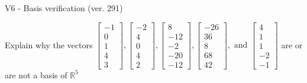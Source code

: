 \begin{exercise}
  \begin{exerciseTitle}V6 - Basis verification (ver. 291)\end{exerciseTitle}
  \begin{exerciseStatement}
    Explain why the vectors \(\left[\begin{array}{r}
-1 \\
0 \\
1 \\
4 \\
3
\end{array}\right] , \left[\begin{array}{r}
-2 \\
4 \\
0 \\
4 \\
2
\end{array}\right] , \left[\begin{array}{r}
8 \\
-12 \\
-2 \\
-20 \\
-12
\end{array}\right] , \left[\begin{array}{r}
-26 \\
36 \\
8 \\
68 \\
42
\end{array}\right] , \text{ and } \left[\begin{array}{r}
4 \\
1 \\
1 \\
-2 \\
-1
\end{array}\right]\) are or are not a basis of \(\mathbb{R}^5\)	



\end{exerciseStatement}
\end{exercise}
